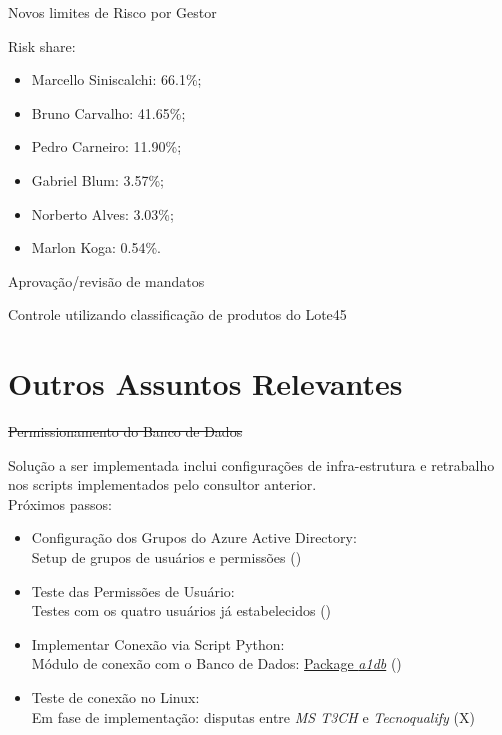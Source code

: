 \documentclass[t,aspectratio=169]{beamer}
\begin{document}
\begin{frame}{Novos limites de Risco por Gestor}

	{\color{blue1}Risk share:} 
	
	
	\begin{itemize}
		\item Marcello Siniscalchi: 66.1\%;
		\item Bruno Carvalho: 41.65\%;
		\item Pedro Carneiro: 11.90\%;
		\item Gabriel Blum: 3.57\%;
		\item Norberto Alves: 3.03\%;
		\item Marlon Koga: 0.54\%.		
	\end{itemize}

	
	{\color{blue1}Aprovação/revisão de mandatos}
	
	{\color{blue1}Controle utilizando classificação de produtos do Lote45}

\end{frame}




\section[Outros]{Outros Assuntos Relevantes}
\begin{frame}{\sout{Permissionamento do Banco de Dados}}
		
	Solução a ser implementada inclui configurações de infra-estrutura e retrabalho nos scripts implementados pelo consultor anterior.\\
	Próximos passos:
	\begin{itemize}
		\item {\color{blue1} Configuração dos Grupos do Azure Active Directory:}\\
		Setup de grupos de usuários e permissões ({\color{green}\checkmark})\\
		\item {\color{blue1} Teste das Permissões de Usuário:}\\
		Testes com os quatro usuários já estabelecidos ({\color{green}\checkmark})\\
		\item {\color{blue1} Implementar Conexão via Script Python:}\\
		Módulo de conexão com o Banco de Dados: \href{https://github.com/asset1capital/a1db}{Package \emph{a1db}}  ({\color{green}\checkmark})
		\item {\color{blue1} Teste de conexão no Linux:}\\
		Em fase de implementação: disputas entre \emph{MS T3CH} e \emph{Tecnoqualify}  ({\color{red}X})
	\end{itemize}

\end{frame}

\end{document}
